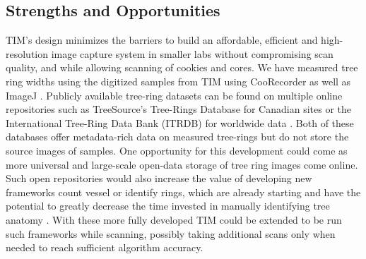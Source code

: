 \documentclass[a4paper,12pt]{article}
\begin{document}
\subsection{Strengths and Opportunities} %
TIM's design minimizes the barriers to build an affordable, efficient and high-resolution image capture system in smaller labs without compromising scan quality, and while allowing scanning of cookies and cores. We have measured tree ring widths using the digitized samples from TIM using CooRecorder as well as ImageJ \citep{schneider_nih_2012}. 
Publicly available tree-ring datasets can be found on multiple online repositories such as TreeSource's Tree-Rings Database for Canadian sites or the International Tree-Ring Data Bank (ITRDB) for worldwide data \citep{girardin_national_2021} \citep{grissino-mayer_international_1997}.
Both of these databases offer metadata-rich data on measured tree-rings but do not store the source images of samples.
One opportunity for this development could come as more universal and large-scale open-data storage of tree ring images come online. 
Such open repositories would also increase the value of developing new frameworks count vessel or identify rings, which are already starting and have the potential to greatly decrease the time invested in manually identifying tree anatomy \citep{resente_mask_2021,polacek_automation_2023}. 
With these more fully developed TIM could be extended to be run such frameworks while scanning, possibly taking additional scans only when needed to reach sufficient algorithm accuracy. %
\end{document}
